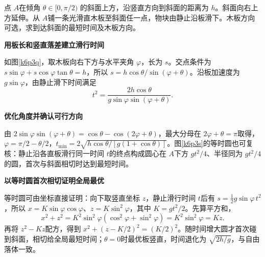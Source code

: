 \begin{question}\begin{example}[到达斜面的最短滑行时间]\label{k6p3}
点 $A$在倾角 $\theta\in[0,\pi/2)$ 的斜面上方，沿竖直方向到斜面的距离为 $h$。斜面向右上方延伸。从 $A$铺一条光滑直木板至斜面任一点，物块由静止沿板滑下。木板方向可选，求到达斜面的最短时间及木板方向。\end{example}
\end{question}
\begin{solution}\textbf{用板长和竖直落差建立滑行时间}\par\nobreak
如图\ref{k6p3q}，取木板向右下方与水平夹角 $\varphi$，长为 $s$。交点条件为 $s\sin\varphi+s\cos\varphi\tan\theta=h$，所以 $s=h\cos\theta/\sin(\varphi+\theta)$。沿板加速度为 $g\sin\varphi$，由静止滑下时间满足
\[t^2=\frac{2h\cos\theta}{g\sin\varphi\sin(\varphi+\theta)}.\]



\par\medskip{}\noindent\textbf{优化角度并确认可行方向}\par\nobreak
由 $2\sin\varphi\sin(\varphi+\theta)=\cos\theta-\cos(2\varphi+\theta)$，最大分母在 $2\varphi+\theta=\pi$取得，$\boxed{\varphi=\pi/2-\theta/2}$，$\boxed{t_{\min}=2\sqrt{h\cos\theta/[g(1+\cos\theta)]}}$。图\ref{k6p3s}的等时圆也可复核：静止沿各直板滑行同一时间 $t$的终点构成圆心在 $A$下方 $gt^2/4$、半径同为 $gt^2/4$的圆，首次与斜面相切时达到最短时间。



\par\medskip{}\noindent\textbf{以等时圆首次相切证明全局最优}\par\nobreak
等时圆可由坐标直接证明：向下取竖直坐标 $z$，静止滑行时间 $t$后有 $s=\tfrac12g\sin\varphi\,t^2$，所以 $x=K\sin\varphi\cos\varphi$、$z=K\sin^2\varphi$，其中 $K=gt^2/2$。先算平方和，
\[
 x^2+z^2=K^2\sin^2\varphi(\cos^2\varphi+\sin^2\varphi)
 =K^2\sin^2\varphi=Kz.
\]
再将 $z^2-Kz$配方，得到 $x^2+(z-K/2)^2=(K/2)^2$。随时间增大圆才首次碰到斜面，相切给全局最短时间；$\theta=0$时最优板竖直，时间退化为 $\sqrt{2h/g}$，与自由落体一致。\end{solution}

